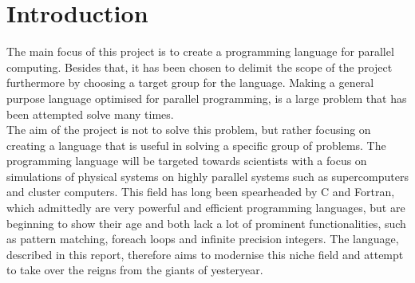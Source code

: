 \chapter{Introduction}{
The main focus of this project is to create a programming language for parallel computing. Besides that, it has been chosen to delimit the scope of the project furthermore by choosing a target group for the language. Making a general purpose language optimised for parallel programming, is a large problem that has been attempted solve many times\cite{parallel programming languages}.
\\The aim of the project is not to solve this problem, but rather focusing on creating a language that is useful in solving a specific group of problems. The programming language will be targeted towards scientists with a focus on simulations of physical systems on highly parallel systems such as supercomputers and cluster computers. This field has long been spearheaded by C and Fortran, which admittedly are very powerful and efficient programming languages, but are beginning to show their age and both lack a lot of prominent functionalities, such as pattern matching, foreach loops and infinite precision integers.
The language, described in this report, therefore aims to modernise this niche field and attempt to take over the reigns from the giants of yesteryear.
}\label{part:introduction}


